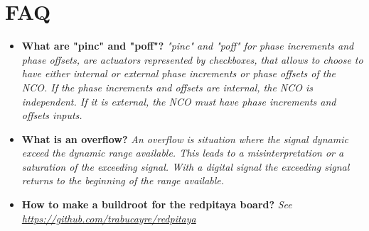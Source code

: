\documentclass[12pt,oneside]{article}
\begin{document}
\section{FAQ}

\begin{itemize}
	\setlength\itemsep{-0.0cm}
	\item \textbf{What are "pinc" and "poff"?} \newline  \textit{"pinc" and "poff" for phase increments and phase offsets, are actuators represented by checkboxes, that allows to choose to have either internal or external phase increments or phase offsets of the NCO. If the phase increments and offsets are internal, the NCO is independent. If it is external, the NCO must have phase increments and offsets inputs.}
	
	\item \textbf{What is an overflow?} \newline  \textit{An overflow is situation where the signal dynamic exceed the dynamic range available. This leads to a misinterpretation or a saturation of the exceeding signal. With a digital signal the exceeding signal returns to the beginning of the range available.}
	
	\item \textbf{How to make a buildroot for the redpitaya board?} \newline  \textit{See \href{https://github.com/trabucayre/redpitaya}{https://github.com/trabucayre/redpitaya}}
\end{itemize}
\end{document}
